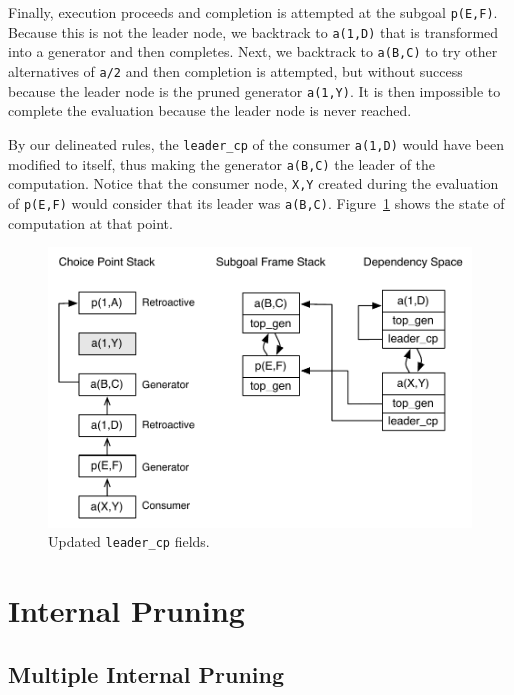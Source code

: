 Finally, execution proceeds and completion is attempted at the subgoal \texttt{p(E,F)}.
Because this is not the leader node, we backtrack to \texttt{a(1,D)} that is transformed
into a generator and then completes. Next, we backtrack to \texttt{a(B,C)} to try other
alternatives of \texttt{a/2} and then completion is attempted, but without success because
the leader node is the pruned generator \texttt{a(1,Y)}. It is then impossible to complete
the evaluation because the leader node is never reached.

By our delineated rules, the \texttt{leader\_cp} of the consumer \texttt{a(1,D)} would have been
modified to itself, thus making the generator \texttt{a(B,C)} the leader of the computation.
Notice that the consumer node, \texttt{X,Y} created during the evaluation of \texttt{p(E,F)} would
consider that its leader was \texttt{a(B,C)}. Figure~\ref{fig:retro_leader_recomputation2} shows the
state of computation at that point.

\begin{figure}[ht]
  \centering
    \includegraphics[scale=0.6]{retro_leader_recomputation2.pdf}
  \caption{Updated \texttt{leader\_cp} fields.}
  \label{fig:retro_leader_recomputation2}
\end{figure}

\section{Internal Pruning}

\subsection{Multiple Internal Pruning}

